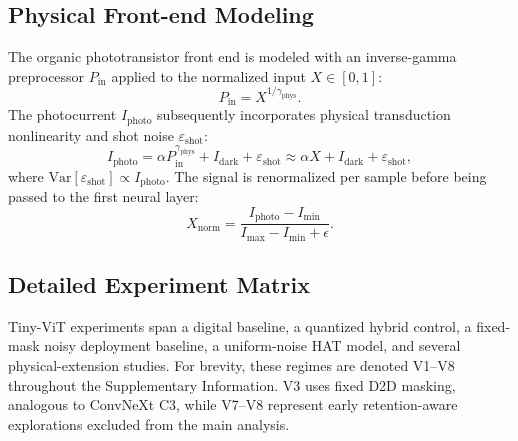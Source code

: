 \subsection{Physical Front-end Modeling}
\label{subsec:supp-frontend-math}

The organic phototransistor front end is modeled with an inverse-gamma preprocessor $P_{\mathrm{in}}$ applied to the normalized input $X \in [0,1]$:
\begin{equation}
    P_{\mathrm{in}} = X^{1/\gamma_{\mathrm{phys}}}.
\label{eq:inverse-gamma}
\end{equation}
The photocurrent $I_{\mathrm{photo}}$ subsequently incorporates physical transduction nonlinearity and shot noise $\varepsilon_{\mathrm{shot}}$:
\begin{equation}
    I_{\mathrm{photo}} = \alpha P_{\mathrm{in}}^{\gamma_{\mathrm{phys}}} + I_{\mathrm{dark}} + \varepsilon_{\mathrm{shot}} \approx \alpha X + I_{\mathrm{dark}} + \varepsilon_{\mathrm{shot}},
\label{eq:frontend-photoresponse}
\end{equation}
where $\mathrm{Var}[\varepsilon_{\mathrm{shot}}] \propto I_{\mathrm{photo}}$. The signal is renormalized per sample before being passed to the first neural layer:
\begin{equation}
    X_{\mathrm{norm}} = \frac{I_{\mathrm{photo}}-I_{\min}}{I_{\max}-I_{\min}+\epsilon}.
\label{eq:frontend-renorm}
\end{equation}

\subsection{Detailed Experiment Matrix}
\label{subsec:detailed-experiment-matrix}

Tiny-ViT experiments span a digital baseline, a quantized hybrid control, a fixed-mask noisy deployment baseline, a uniform-noise HAT model, and several physical-extension studies. For brevity, these regimes are denoted V1--V8 throughout the Supplementary Information. V3 uses fixed D2D masking, analogous to ConvNeXt C3, while V7--V8 represent early retention-aware explorations excluded from the main analysis.

